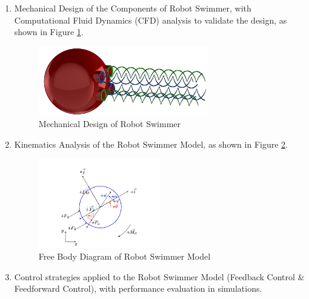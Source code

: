 \documentclass[12pt]{article}
\begin{document}
\begin{enumerate}

    \item {Mechanical Design of the Components of Robot Swimmer, with Computational Fluid Dynamics (CFD) analysis to validate the design, as shown in Figure \ref*{Design-RobotSwimmer}. }
    
    \begin{figure}[H]
        \centering
        \includegraphics*[width = 0.7\textwidth]{portfolio/overview new.png}
        \caption{Mechanical Design of Robot Swimmer}
        \label{Design-RobotSwimmer}
    \end{figure}
    
    \item {Kinematics Analysis of the Robot Swimmer Model, as shown in Figure \ref*{FBD-RobotSwimmer}.}
    
    \begin{figure}[H]
        \centering
        \includegraphics*[width = 0.5\textwidth]{portfolio/FBD_RobotSwimmer.png}
        \caption{Free Body Diagram of Robot Swimmer Model}
        \label{FBD-RobotSwimmer}
    \end{figure}

    \item {Control strategies applied to the Robot Swimmer Model (Feedback Control \& Feedforward Control), with performance evaluation in simulations.}


\end{enumerate}
\end{document}
